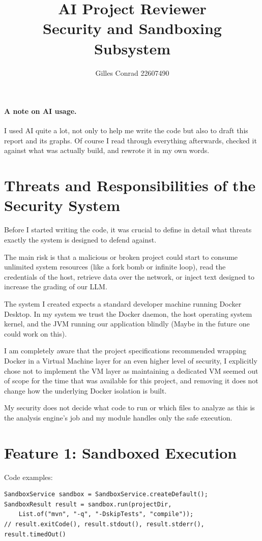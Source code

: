 \documentclass[11pt]{article}
\title{AI Project Reviewer \\ \large Security and Sandboxing Subsystem}
\author{Gilles Conrad 22607490}
\begin{document}
\maketitle

\paragraph{A note on AI usage.} I used AI quite a lot, not only to help me write the code but also to draft this report and its graphs. Of course I read through everything afterwards, checked it against what was actually build, and rewrote it in my own words.

\section{Threats and Responsibilities of the Security System}
Before I started writing the code, it was crucial to define in detail what threats exactly the system is designed to defend against.

The main risk is that a malicious or broken project could start to consume unlimited system resources (like a fork bomb or infinite loop), read the credentials of the host, retrieve data over the network, or inject text designed to increase the grading of our LLM.

The system I created expects a standard developer machine running Docker Desktop. In my system we trust the Docker daemon, the host operating system kernel, and the JVM running our application blindly (Maybe in the future one could work on this). 

I am completely aware that the project specifications recommended wrapping Docker in a Virtual Machine layer for an even higher level of security, I explicitly chose not to implement the VM layer as maintaining a dedicated VM seemed out of scope for the time that was available for this project, and removing it does not change how the underlying Docker isolation is built.

My security does not decide what code to run or which files to analyze as this is the analysis engine's job and my module handles only the safe execution.

\section{Feature 1: Sandboxed Execution}

Code examples:

\begin{verbatim}
SandboxService sandbox = SandboxService.createDefault();
SandboxResult result = sandbox.run(projectDir,
    List.of("mvn", "-q", "-DskipTests", "compile"));
// result.exitCode(), result.stdout(), result.stderr(), result.timedOut()
\end{verbatim}
\end{document}
